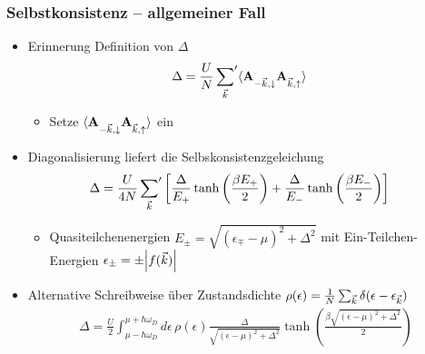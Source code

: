 \begin{frame}
    \frametitle{Selbstkonsistenz -- allgemeiner Fall}
    \begin{itemize}
        \item Erinnerung Definition von $\Delta$
        \begin{align*}
            \Delta &= \frac{U}{N}\sump{\vk} \expval{\oadown \oaup}
        \end{align*}
        \begin{itemize}
            \item[$\rightarrow$] Setze $\expval{\oadown \oaup}$ ein
        \end{itemize}
        \item Diagonalisierung liefert die Selbskonsistenzgeleichung 
        \begin{align*}
            \Delta &= \frac{U}{4N} \sideset{}{'}\sum_{{\vec{k}}} \left[\frac{\Delta}{E_+} \tanh\left(\frac{\beta E_+}{2}\right) + \frac{\Delta}{E_-} \tanh\left(\frac{\beta E_-}{2}\right)\right]
        \end{align*}
        \begin{itemize}
            \item[$\rightarrow$] Quasiteilchenenergien $E_\pm = \sqrt{(\epsilon_{\mp} - \mu)^2 + \Delta^2}$ mit Ein-Teilchen-Energien $\epsilon_\pm = \pm \abs{f({\vec{k}})}$ 
        \end{itemize}
        \pause
        \item Alternative Schreibweise über Zustandsdichte $\rho(\epsilon) = \frac{1}{N} \sum_{{\vec{k}}} \delta(\epsilon - \epsilon_{\vec{k}})$
        \begin{align*}
            \Delta = \frac{U}{2} \int_{\mu -\hbar \omega_D}^{\mu + \hbar \omega_D} d\epsilon \, \rho(\epsilon) \frac{\Delta}{\sqrt{(\epsilon - \mu)^2 + \Delta^2}} \tanh\left(\frac{\beta \sqrt{(\epsilon - \mu)^2 + \Delta^2}}{2}\right)
        \end{align*}
    \end{itemize}
\end{frame}


